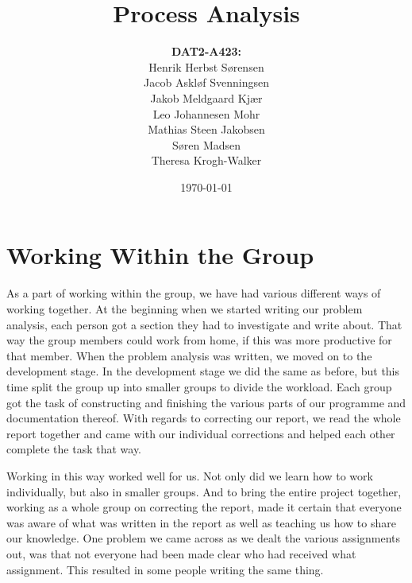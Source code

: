 

\title{Process Analysis}
\author{\textbf{DAT2-A423:}\\
    Henrik Herbst Sørensen\\
    Jacob Askløf Svenningsen\\
    Jakob Meldgaard Kjær\\
    Leo Johannesen Mohr\\
    Mathias Steen Jakobsen\\ 
    Søren Madsen\\
    Theresa Krogh-Walker}
\date{\today}
\maketitle 
\section{Working Within the Group}
As a part of working within the group, we have had various different ways of working together. 
At the beginning when we started writing our problem analysis, each person got a section they had to investigate and write about. 
That way the group members could work from home, if this was more productive for that member.
When the problem analysis was written, we moved on to the development stage. 
In the development stage we did the same as before, but this time split the group up into smaller groups to divide the workload. 
Each group got the task of constructing and finishing the various parts of our programme and documentation thereof. 
With regards to correcting our report, we read the whole report together and came with our individual corrections and helped each other complete the task that way.

Working in this way worked well for us.
Not only did we learn how to work individually, but also in smaller groups. 
And to bring the entire project together, working as a whole group on correcting the report, made it certain that everyone was aware of what was written in the report as well as teaching us how to share our knowledge. 
One problem we came across as we dealt the various assignments out, was that not everyone had been made clear who had received what assignment.
This resulted in some people writing the same thing.

